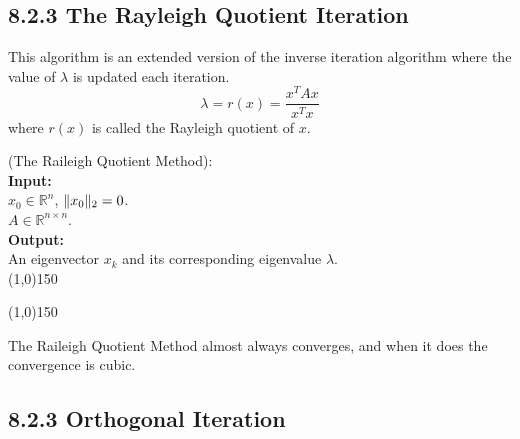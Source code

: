 
\subsection*{8.2.3 The Rayleigh Quotient Iteration} %
This algorithm is an extended version of the inverse iteration algorithm where
the value of $\lambda$ is updated each iteration.
\begin{equation}
	\lambda = r(x) = \frac{x^TAx}{x^Tx}
\end{equation}
where $r(x)$ is called the Rayleigh quotient of $x$.
%
%
\begin{algo}
{
%
	(The Raileigh Quotient Method):
%
}\\
\textbf{Input: }
{
%
	\\$x_0\in\mathbb R^n$, $\lVert{x_0}\rVert_2=0$.
	\\$A\in\mathbb R^{n\times n}$.
%
}\\
\textbf{Output: }
{
%
	\\An eigenvector $x_k$ and its corresponding eigenvalue $\lambda$.
%
}\\
\line(1,0){150}
\begin{algorithmic}
%
\EndFor{}
%
\end{algorithmic}
\line(1,0){150}
\end{algo}
%
%
The Raileigh Quotient Method almost always converges, and when it does the convergence is cubic.


\subsection*{8.2.3 Orthogonal Iteration} %

